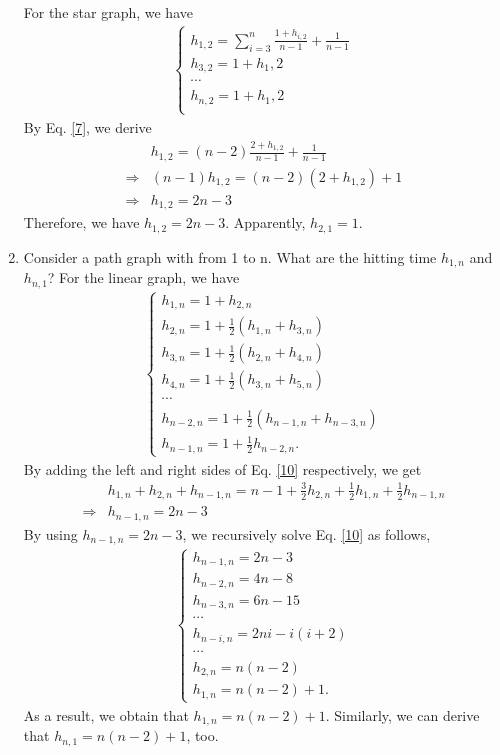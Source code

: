 \begin{problem}[30 points]
\begin{enumerate}
  \Answer
  For the star graph, we have
  \begin{align}\label{7}
\begin{cases}
h_{1,2} = \sum_{i=3}^{n}\frac{1+h_{i,2}}{n-1} + \frac{1}{n-1}\\
h_{3,2} = 1+h_1,2\\
\cdots\\
h_{n,2} = 1+h_1,2\\
\end{cases}
\end{align}
  By Eq. \eqref{7}, we derive
  \begin{align}
  &  h_{1,2} = (n-2)\frac{2+h_{1,2}}{n-1} + \frac{1}{n-1}\nonumber\\
   \Longrightarrow &(n-1) h_{1,2} =  (n-2)(2+h_{1,2}) +1\nonumber\\
   \Longrightarrow&  h_{1,2} = 2n-3  
  \end{align}
  Therefore, we have $h_{1,2} = 2n-3$. Apparently,  $h_{2,1} = 1$.
  
  \item Consider a path graph with from 1 to n. What are the hitting time $h_{1,n}$ and $h_{n,1}$?
    \Answer
    For the linear graph, we have
  \begin{align}\label{10}
\begin{cases}
h_{1,n} = 1+h_{2,n} \\
h_{2,n} =1+ \frac{1}{2}(h_{1,n}+h_{3,n})\\
h_{3,n} =1+ \frac{1}{2}(h_{2,n}+h_{4,n})\\
h_{4,n} =1+ \frac{1}{2}(h_{3,n}+h_{5,n})\\
\cdots\\
h_{n-2,n} =1+ \frac{1}{2}(h_{n-1,n}+h_{n-3,n})\\
h_{n-1,n} =1+ \frac{1}{2}h_{n-2,n}.
\end{cases}
\end{align}
  By adding the left and right sides of Eq. \eqref{10} respectively, we get
  \begin{align}
  &  h_{1,n}+h_{2,n}+h_{n-1,n} = n-1 + \frac{3}{2}h_{2,n} +\frac{1}{2}h_{1,n}+\frac{1}{2}h_{n-1,n} \nonumber\\
   \Longrightarrow &h_{n-1,n} = 2n-3
  \end{align}
  By using $h_{n-1,n} = 2n-3$, we recursively solve Eq. \eqref{10} as follows,
  \begin{align}\label{15}
\begin{cases}
h_{n-1,n} = 2n-3 \\
h_{n-2,n} =4n-8\\
h_{n-3,n} =6n-15\\
\cdots\\
h_{n-i,n} =2ni - i(i+2)\\
\cdots\\
h_{2,n} =n(n-2)\\
h_{1,n} =n(n-2)+1.
\end{cases}
\end{align}
As a result, we obtain that $h_{1,n} =n(n-2)+1$. Similarly, we can derive that $h_{n,1} =n(n-2)+1$, too.
  

\end{enumerate}
\end{problem}
